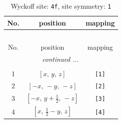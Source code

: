 \documentclass[fleqn,8pt]{jsarticle}
\begin{document}
\renewcommand{\arraystretch}{1.2}
\begin{longtable}{ccc}
\caption{Wyckoff site: {\tt 4f}, site symmetry: {\tt 1}}
 \\
 \hline \hline
No. & position & mapping \\ \hline \endfirsthead

\multicolumn{2}{l}{\tablename\ \thetable{}} \\
 \hline \hline
No. & position & mapping \\ \hline \endhead

 \hline \hline
\multicolumn{2}{r}{\footnotesize\it continued ...} \\ \endfoot

 \hline \hline
\multicolumn{2}{r}{} \\ \endlastfoot

1 & $\left[ x,\, y,\, z \right]$ & {\tt [1]} \\ \hline
2 & $\left[ - x,\, - y,\, - z \right]$ & {\tt [2]} \\ \hline
3 & $\left[ - x,\, y + \frac{1}{2},\, - z \right]$ & {\tt [3]} \\ \hline
4 & $\left[ x,\, \frac{1}{2} - y,\, z \right]$ & {\tt [4]} \\
\end{longtable}
\end{document}

